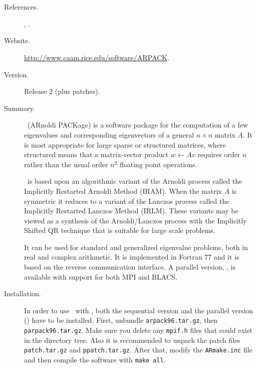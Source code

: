 \section*{\underline{\arpack}}
	\begin{description}
	\item[References.]\citep{Lehoucq:1998:AUG}, \citep{Maschhoff:1996:PEP}.
	\item[Website.] \url{http://www.caam.rice.edu/software/ARPACK}.
	\item[Version.] Release 2 (plus patches).
	\item[Summary.] \arpack\ (ARnoldi PACKage) is a software package for the computation of a few eigenvalues and corresponding eigenvectors of a general $n\times n$ matrix $A$. It is most appropriate for large sparse or structured matrices, where structured means that a matrix-vector product $w \leftarrow Av$ requires order $n$ rather than the usual order $n^2$ floating point operations. 
	
	\arpack\ is based upon an algorithmic variant of the Arnoldi process called the Implicitly Restarted Arnoldi Method (IRAM). When the matrix $A$ is symmetric it reduces to a variant of the Lanczos process called the Implicitly Restarted Lanczos Method (IRLM). These variants may be viewed as a synthesis of the Arnoldi/Lanczos process with the Implicitly Shifted QR technique that is suitable for large scale problems. 

	It can be used for standard and generalized eigenvalue problems, both in real and complex arithmetic. It is implemented in Fortran 77 and it is based on the reverse communication interface. A parallel version, \parpack, is available with support for both MPI and BLACS.
	\item[Installation.]
	In order to use \arpack\ with \slepc, both the sequential version and the parallel version (\parpack) have to be installed. First, unbundle \texttt{arpack96.tar.gz}, then \texttt{parpack96.tar.gz}. Make sure you delete any \texttt{mpif.h} files that could exist in the directory tree. Also it is recommended to unpack the patch files \texttt{patch.tar.gz} and \texttt{ppatch.tar.gz}. After that, modify the \texttt{ARmake.inc} file and then compile the software with \texttt{make all}.
	\end{description}

